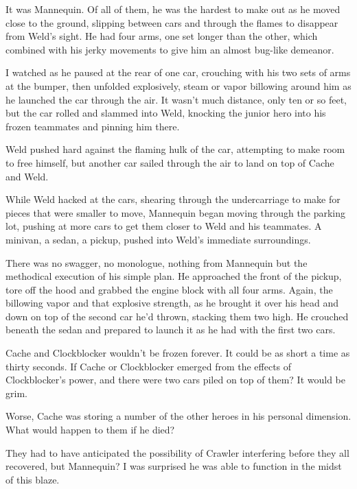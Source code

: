 It was Mannequin.  Of all of them, he was the hardest to make out as he moved close to the ground, slipping between cars and through the flames to disappear from Weld's sight. He had four arms, one set longer than the other, which combined with his jerky movements to give him an almost bug-like demeanor.



I watched as he paused at the rear of one car, crouching with his two sets of arms at the bumper, then unfolded explosively, steam or vapor billowing around him as he launched the car through the air.  It wasn't much distance, only ten or so feet, but the car rolled and slammed into Weld, knocking the junior hero into his frozen teammates and pinning him there.



Weld pushed hard against the flaming hulk of the car, attempting to make room to free himself, but another car sailed through the air to land on top of Cache and Weld.



While Weld hacked at the cars, shearing through the undercarriage to make for pieces that were smaller to move, Mannequin began moving through the parking lot, pushing at more cars to get them closer to Weld and his teammates.  A minivan, a sedan, a pickup, pushed into Weld's immediate surroundings.



There was no swagger, no monologue, nothing from Mannequin but the methodical execution of his simple plan.  He approached the front of the pickup, tore off the hood and grabbed the engine block with all four arms.  Again, the billowing vapor and that explosive strength, as he brought it over his head and down on top of the second car he'd thrown, stacking them two high.  He crouched beneath the sedan and prepared to launch it as he had with the first two cars.



Cache and Clockblocker wouldn't be frozen forever.  It could be as short a time as thirty seconds.  If Cache or Clockblocker emerged from the effects of Clockblocker's power, and there were two cars piled on top of them?  It would be grim.



Worse, Cache was storing a number of the other heroes in his personal dimension.  What would happen to them if he died?



They had to have anticipated the possibility of Crawler interfering before they all recovered, but Mannequin?  I was surprised he was able to function in the midst of this blaze.



